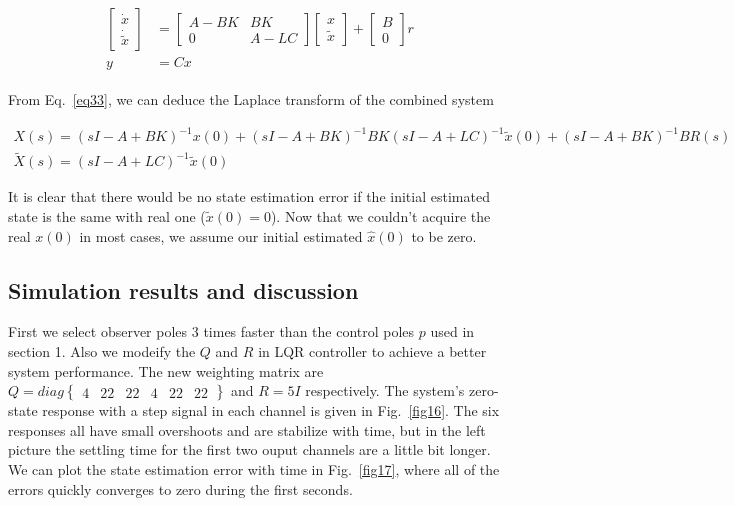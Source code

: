 \documentclass[hyperref]{article}
\theoremstyle{nonumberplain}
\begin{document}
	\begin{equation}
	\begin{split}
	\begin{aligned}
		\begin{bmatrix}
		\dot{x}\\ \dot{\tilde{x}}
		\end{bmatrix}&=\begin{bmatrix}
		A-BK &BK \\ 
		0 &A-LC 
		\end{bmatrix}
		\begin{bmatrix}
		x\\\tilde{x} 
		\end{bmatrix}+
		\begin{bmatrix}
		B\\0 	
		\end{bmatrix}r
		\\
		y&=Cx
	\label{eq33}
	\end{aligned}
	\end{split}
	\end{equation}
	
	From Eq.~\ref{eq33}, we can deduce the Laplace transform of the combined system
	
	\begin{gather}
	X(s)=(sI-A+BK)^{-1}x(0)+(sI-A+BK)^{-1}BK(sI-A+LC)^{-1}\tilde{x}(0)+(sI-A+BK)^{-1}BR(s) \nonumber\\
	\tilde{X}(s)=(sI-A+LC)^{-1}\tilde{x}(0)
	\label{eq34}
	\end{gather}
	
	It is clear that there would be no state estimation error if the initial estimated state is the same with real one ($\tilde{x}(0)=0$). Now that we couldn't acquire the real $x(0)$ in most cases, we assume our initial estimated $\hat{x}(0)$ to be zero.
	
	
	\subsection{Simulation results and discussion}
	
	\hspace{1.0em}
	First we select observer poles 3 times faster than the control poles $p$ used in section 1. Also we modeify the $Q$ and $R$ in LQR controller to achieve a better system performance. The new weighting matrix are $Q=diag\begin{Bmatrix}
	4&  22&  22&  4&  22&22 
	\end{Bmatrix}$ and $R=5I$ respectively. The system's zero-state response with a step signal in each channel is given in Fig.~\ref{fig16}. The six responses all have small overshoots and are stabilize with time, but in the left picture the settling time for the first two ouput channels are a little bit longer. We can plot the state estimation error with time in Fig.~\ref{fig17}, where all of the errors quickly converges to zero during the first seconds.
	
\end{document}
